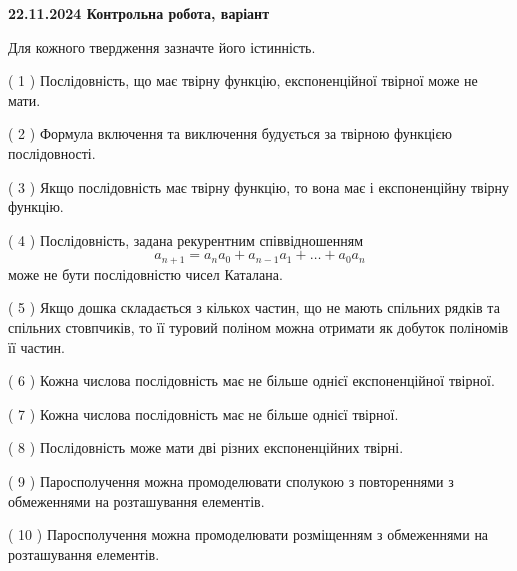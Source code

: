 \documentclass[12pt, ukrainian]{article}
\begin{document}
\vspace{4mm}
\newpage
\begin {large}

\textbf{22.11.2024 Контрольна робота, варіант  }\par


{
Для кожного твердження зазначте його істинність.\par
\vspace{2mm}
( 1 ) Послідовність, що має твірну функцію, експоненційної твірної може не мати.%

( 2 ) Формула включення та виключення будується за твірною функцією послідовності.%

( 3 ) Якщо послідовність має твірну функцію, то вона має і експоненційну твірну функцію.%

( 4 ) Послідовність, задана рекурентним співвідношенням $$a_{n+1}=a_{n}a_{0}+a_{n-1}a_{1}+\ldots+a_0a_{n}$$ може не бути послідовністю чисел Каталана.%

( 5 ) Якщо дошка складається з кількох частин, що не мають спільних рядків та спільних стовпчиків, то її туровий поліном можна отримати як добуток поліномів її частин.%

( 6 ) Кожна числова послідовність має не більше однієї  експоненційної твірної.%

( 7 ) Кожна числова послідовність має не більше однієї твірної.%

( 8 ) Послідовність може мати дві різних експоненційних твірні.%

( 9 ) Паросполучення можна промоделювати сполукою з повтореннями з обмеженнями на розташування елементів.%

( 10 ) Паросполучення можна промоделювати розміщенням з обмеженнями на розташування елементів.%


\vspace{5mm}
}
\end {large}
\end{document}
